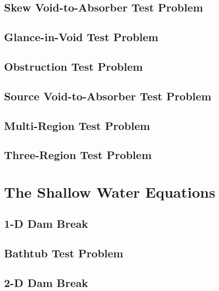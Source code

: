 \subsection{Skew Void-to-Absorber Test Problem\label{sec:skew_void_to_absorber}}
  
\subsection{Glance-in-Void Test Problem\label{sec:glance_in_void}}
  
\subsection{Obstruction Test Problem\label{sec:obstruction}}
  
\subsection{Source Void-to-Absorber Test Problem\label{sec:source_void_to_absorber}}
  
\subsection{Multi-Region Test Problem\label{sec:multi_region}}
  
\subsection{Three-Region Test Problem\label{sec:three_region}}
  
\section{The Shallow Water Equations\label{sec:shallow_water_results}}
\subsection{1-D Dam Break\label{sec:dam_break_1d}}
  
\subsection{Bathtub Test Problem\label{sec:bathtub}}
  
\subsection{2-D Dam Break\label{sec:dam_break_2d}}
  
